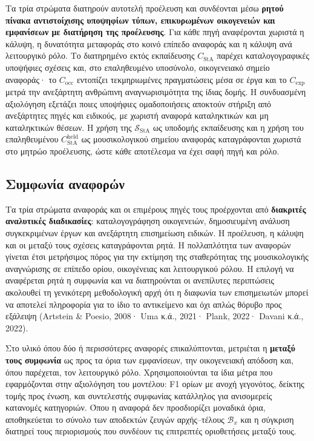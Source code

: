 \documentclass[11pt,a4paper]{article}
\begin{document}
Τα τρία στρώματα διατηρούν αυτοτελή προέλευση και συνδέονται μέσω \textbf{ρητού πίνακα αντιστοίχισης υποψηφίων τύπων, επικυρωμένων οικογενειών και εμφανίσεων με διατήρηση της προέλευσης}. Για κάθε πηγή αναφέρονται χωριστά η κάλυψη, η δυνατότητα μεταφοράς στο κοινό επίπεδο αναφοράς και η κάλυψη ανά λειτουργικό ρόλο. Το διατηρημένο εκτός εκπαίδευσης \(C_{\mathrm{StA}}\) παρέχει καταλογογραφικές υποψήφιες σχέσεις και, στο επαληθευμένο υποσύνολο, οικογενειακό σημείο αναφοράς· το \(C_{\mathrm{occ}}\) εντοπίζει τεκμηριωμένες πραγματώσεις μέσα σε έργα και το \(C_{\mathrm{exp}}\) μετρά την ανεξάρτητη ανθρώπινη αναγνωρισιμότητα της ίδιας δομής. Η συνδυασμένη αξιολόγηση εξετάζει ποιες υποψήφιες ομαδοποιήσεις αποκτούν στήριξη από ανεξάρτητες πηγές και ειδικούς, με χωριστή αναφορά καταληκτικών και μη καταληκτικών θέσεων. Η χρήση της $\mathcal S_{\mathrm{StA}}$ ως υποδομής εκπαίδευσης και η χρήση του επαληθευμένου $C_{\mathrm{StA}}^{\mathrm{held}}$ ως μουσικολογικού σημείου αναφοράς καταγράφονται χωριστά στο μητρώο προέλευσης, ώστε κάθε αποτέλεσμα να έχει σαφή πηγή και ρόλο.

\subsection{Συμφωνία αναφορών}\label{app:corpora-agreement}

Τα τρία στρώματα αναφοράς και οι επιμέρους πηγές τους προέρχονται από \textbf{διακριτές αναλυτικές διαδικασίες}: καταλογογράφηση οικογενειών, δημοσιευμένη ανάλυση συγκεκριμένων έργων και ανεξάρτητη επισημείωση ειδικών. Η προέλευση, η κάλυψη και οι μεταξύ τους σχέσεις καταγράφονται ρητά. Η πολλαπλότητα των αναφορών γίνεται έτσι μετρήσιμος πόρος για την εκτίμηση της σταθερότητας της μουσικολογικής αναγνώρισης σε επίπεδο ορίου, οικογένειας και λειτουργικού ρόλου. Η επιλογή να αναφέρεται ρητά η συμφωνία και να διατηρούνται οι ανεπίλυτες περιπτώσεις ακολουθεί τη γενικότερη μεθοδολογική αρχή ότι η διαφωνία των επισημειωτών μπορεί να αποτελεί πληροφορία για το ίδιο το αντικείμενο και όχι απλώς θόρυβο προς εξάλειψη (Artstein \& Poesio, 2008· Uma κ.ά., 2021· Plank, 2022· Davani κ.ά., 2022).

Στο υλικό όπου δύο ή περισσότερες αναφορές επικαλύπτονται, μετριέται η \textbf{μεταξύ τους συμφωνία} ως προς τα όρια των εμφανίσεων, την οικογενειακή απόδοση και, όπου παρέχεται, τον λειτουργικό ρόλο. Χρησιμοποιούνται τα ίδια μέτρα που εφαρμόζονται στην αξιολόγηση του μοντέλου: F1 ορίων με ανοχή γεγονότος, δείκτης τομής προς ένωση, και συντελεστής συμφωνίας κατάλληλος για ανισομερείς κατανομές κατηγοριών. Όπου η αναφορά δεν προσδιορίζει μοναδικά όρια, αποθηκεύεται το σύνολο των αποδεκτών ζευγών αρχής--τέλους $\mathcal B_x$ και η σύγκριση διατηρεί τους περιορισμούς που συνδέουν τις επιτρεπτές οριοθετήσεις μεταξύ τους.
\end{document}

